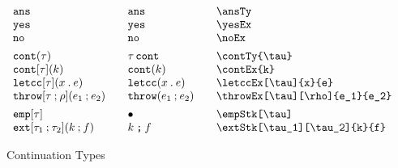 \documentclass[11pt]{article}
\begin{document}
\begin{figure}

  \begin{small}
    \begin{displaymath}
      \begin{array}{l@{\qquad}l@{\qquad}l@{\qquad}l}
        \ansTy                         & \ansTy*             & \verb|\ansTy|                         \\
        \yesEx                         & \yesEx*             & \verb|\yesEx|                         \\
        \noEx                          & \noEx*              & \verb|\noEx|                          \\[1ex]

        \contTy{\tau}                  & \contTy*{\tau}      & \verb|\contTy{\tau}|                  \\
        \contEx{k}                     & \contEx*{k}         & \verb|\contEx{k} |                    \\
        \letccEx[\tau]{x}{e}           & \letccEx*{x}{e}     & \verb|\letccEx[\tau]{x}{e}|           \\
        \throwEx[\tau][\rho]{e_1}{e_2} & \throwEx*{e_1}{e_2} & \verb|\throwEx[\tau][\rho]{e_1}{e_2}| \\[1ex]

        \empStk[\tau]                  & \empStk*[\tau]      & \verb|\empStk[\tau]|                  \\
        \extStk[\tau_1][\tau_2]{k}{f}  & \extStk*{k}{f}      & \verb|\extStk[\tau_1][\tau_2]{k}{f}|
      \end{array}
    \end{displaymath}
  \end{small}

  \caption{Continuation Types}
  \label{fig:cont}
\end{figure}
\end{document}
